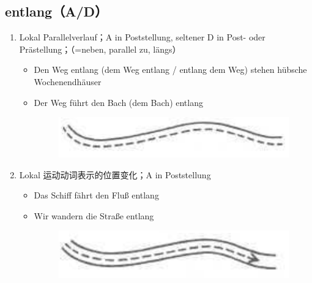 \documentclass[UTF8]{report}
\begin{document}
\subsection{entlang（A/D）}
\begin{enumerate}
    \item Lokal Parallelverlauf；A in Poststellung, seltener D in Post- oder Prästellung；（=neben, parallel zu, längs）
    \begin{itemize}
        \item Den Weg entlang (dem Weg entlang / entlang dem Weg) stehen hübsche Wochenendhäuser
        \item Der Weg führt den Bach (dem Bach) entlang
        \begin{figure}[H]
            \centering
            \includegraphics[scale=0.3]{entlang1.png}
        \end{figure}
    \end{itemize}
    \item Lokal 运动动词表示的位置变化；A in Poststellung
    \begin{itemize}
        \item Das Schiff fährt den Fluß entlang
        \item Wir wandern die Straße entlang
        \begin{figure}[H]
            \centering
            \includegraphics[scale=0.3]{entlang2.png}
        \end{figure}
    \end{itemize}
\end{enumerate}
\end{document}
